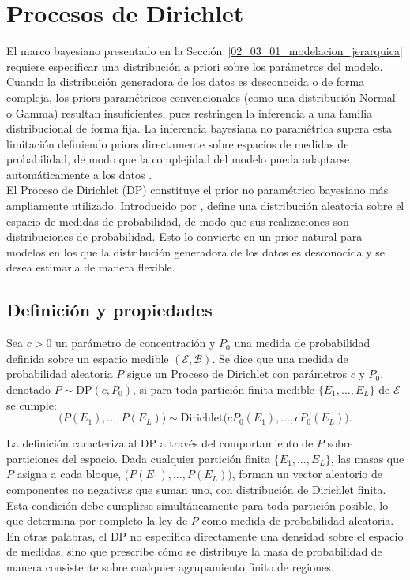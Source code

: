 \section{Procesos de Dirichlet}
\label{02_04_00_procesos_dirichlet}
El marco bayesiano presentado en la Sección~\ref{02_03_01_modelacion_jerarquica} requiere especificar una distribución a priori sobre los parámetros del modelo. Cuando la distribución generadora de los datos es desconocida o de forma compleja, los priors paramétricos convencionales (como una distribución Normal o Gamma) resultan insuficientes, pues restringen la inferencia a una familia distribucional de forma fija. La inferencia bayesiana no paramétrica supera esta limitación definiendo priors directamente sobre espacios de medidas de probabilidad, de modo que la complejidad del modelo pueda adaptarse automáticamente a los datos \citep{02_04_muller2015bayesian}.\\

El Proceso de Dirichlet (DP) constituye el prior no paramétrico bayesiano más ampliamente utilizado. Introducido por \citet{02_04_ferguson1973bayesian}, define una distribución aleatoria sobre el espacio de medidas de probabilidad, de modo que sus realizaciones son distribuciones de probabilidad. Esto lo convierte en un prior natural para modelos en los que la distribución generadora de los datos es desconocida y se desea estimarla de manera flexible.

\subsection{Definición y propiedades}
\label{02_04_01_propiedades_dp}
\begin{definition}
Sea $c > 0$ un parámetro de concentración y $P_0$ una medida de probabilidad definida sobre un espacio medible $(\mathcal{E}, \mathcal{B})$. Se dice que una medida de probabilidad aleatoria $P$ sigue un Proceso de Dirichlet con parámetros $c$ y $P_0$, denotado $P \sim \mathrm{DP}(c, P_0)$, si para toda partición finita medible $\{E_1, \dots, E_L\}$ de $\mathcal{E}$ se cumple:
\begin{equation}
    \bigl(P(E_1), \dots, P(E_L)\bigr)
    \sim \mathrm{Dirichlet}\bigl(c P_0(E_1), \dots, c P_0(E_L)\bigr).
\end{equation}
\end{definition}

La definición caracteriza al DP a través del comportamiento de $P$ sobre particiones del espacio. Dada cualquier partición finita $\{E_1, \dots, E_L\}$, las masas que $P$ asigna a cada bloque, $\bigl(P(E_1), \dots, P(E_L)\bigr)$, forman un vector aleatorio de componentes no negativas que suman uno, con distribución de Dirichlet finita. Esta condición debe cumplirse simultáneamente para toda partición posible, lo que determina por completo la ley de $P$ como medida de probabilidad aleatoria. En otras palabras, el DP no especifica directamente una densidad sobre el espacio de medidas, sino que prescribe cómo se distribuye la masa de probabilidad de manera consistente sobre cualquier agrupamiento finito de regiones.\\


